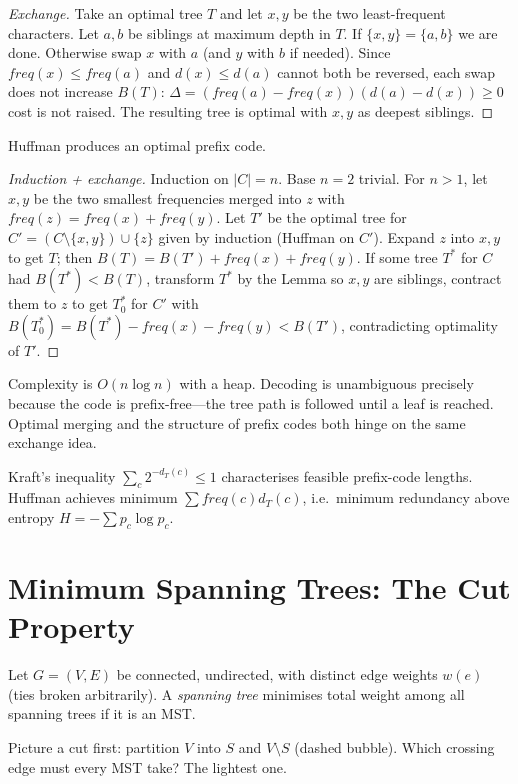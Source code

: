\begin{proof}[Exchange]
Take an optimal tree $T$ and let $x,y$ be the two least-frequent characters. Let $a,b$ be siblings at maximum depth in $T$. If $\{x,y\}=\{a,b\}$ we are done. Otherwise swap $x$ with $a$ (and $y$ with $b$ if needed). Since $freq(x)\le freq(a)$ and $d(x)\le d(a)$ cannot both be reversed, each swap does not increase $B(T)$: $\Delta = (freq(a)-freq(x))(d(a)-d(x))\ge 0$ cost is not raised. The resulting tree is optimal with $x,y$ as deepest siblings.
\end{proof}

\begin{theorem}
Huffman produces an optimal prefix code.
\end{theorem}
\begin{proof}[Induction + exchange]
Induction on $|C|=n$. Base $n=2$ trivial. For $n>1$, let $x,y$ be the two smallest frequencies merged into $z$ with $freq(z)=freq(x)+freq(y)$. Let $T'$ be the optimal tree for $C'=(C\setminus\{x,y\})\cup\{z\}$ given by induction (Huffman on $C'$). Expand $z$ into $x,y$ to get $T$; then $B(T)=B(T')+freq(x)+freq(y)$. If some tree $T^*$ for $C$ had $B(T^*)<B(T)$, transform $T^*$ by the Lemma so $x,y$ are siblings, contract them to $z$ to get $T^*_0$ for $C'$ with $B(T^*_0)=B(T^*)-freq(x)-freq(y)<B(T')$, contradicting optimality of $T'$.
\end{proof}
Complexity is $O(n\log n)$ with a heap. Decoding is unambiguous precisely because the code is prefix-free---the tree path is followed until a leaf is reached. Optimal merging and the structure of prefix codes both hinge on the same exchange idea.

\begin{remark}
Kraft's inequality $\sum_c 2^{-d_T(c)}\le 1$ characterises feasible prefix-code lengths. Huffman achieves minimum $\sum freq(c)d_T(c)$, i.e.\ minimum redundancy above entropy $H=-\sum p_c\log p_c$.
\end{remark}

\section{Minimum Spanning Trees: The Cut Property}
\label{sec:mst}

Let $G=(V,E)$ be connected, undirected, with distinct edge weights $w(e)$ (ties broken arbitrarily). A \emph{spanning tree} minimises total weight among all spanning trees if it is an MST.

Picture a cut first: partition $V$ into $S$ and $V\setminus S$ (dashed bubble). Which crossing edge must every MST take? The lightest one.

